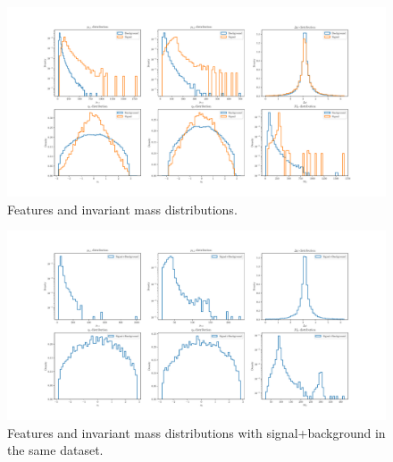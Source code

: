 \begin{figure}[H]
	\begin{center}
		\includegraphics[width=1.0\textwidth]{Python/Z/features.pdf}
		\caption{Features and invariant mass distributions.}
		\label{fig:FEATURES_DISTRIBUTIONS}
	\end{center}
\end{figure}

\begin{figure}[H]
	\begin{center}
		\includegraphics[width=1.0\textwidth]{Python/Z/sig_plus_bkg.pdf}
		\caption{Features and invariant mass distributions with signal+background in the same dataset.}
		\label{fig:SIG_PLUS_BKG_DISTRIBUTIONS}
	\end{center}
\end{figure}